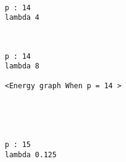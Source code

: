 \documentclass[11pt]{article}
\begin{document}
    \begin{center}
    \end{center}
    { \hspace*{\fill} \\}
    
    \begin{Verbatim}[commandchars=\\\{\}]
p : 14
lambda 4

    \end{Verbatim}

    \begin{center}
    \end{center}
    { \hspace*{\fill} \\}
    
    \begin{Verbatim}[commandchars=\\\{\}]
p : 14
lambda 8

<Energy graph When p = 14 >

    \end{Verbatim}

    \begin{center}
    \end{center}
    { \hspace*{\fill} \\}
    
    \begin{center}
    \end{center}
    { \hspace*{\fill} \\}
    
    \begin{Verbatim}[commandchars=\\\{\}]
p : 15
lambda 0.125

    \end{Verbatim}

    \begin{center}
    \end{center}
    { \hspace*{\fill} \\}
    
\end{document}
